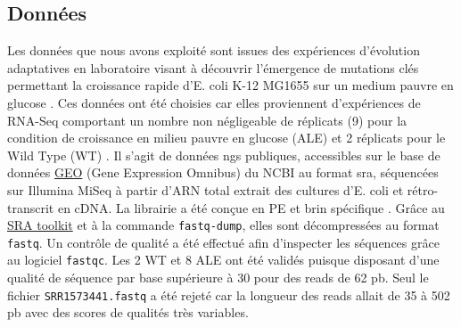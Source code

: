 \documentclass[12pt,a4paper]{report}
\begin{document}
\begin{onehalfspace}
\section*{Données}
Les données que nous avons exploité sont issues des expériences d'évolution adaptatives en laboratoire visant à découvrir l'émergence de mutations clés permettant la croissance rapide d'E. coli K-12 MG1655 sur un medium pauvre en glucose \citep{Lacroix2014}. Ces données ont été choisies car elles proviennent d'expériences de RNA-Seq comportant un nombre non négligeable de réplicats (9) pour la condition de croissance en milieu pauvre en glucose (ALE) et 2 réplicats pour le Wild Type (WT) . Il s'agit de données \gls{ngs} publiques, accessibles sur le base de données \href{http://www.ncbi.nlm.nih.gov/geo/query/acc.cgi?acc=GSE61327}{GEO} (Gene Expression Omnibus) du NCBI au format \gls{sra}, séquencées sur Illumina MiSeq à partir d'ARN total extrait des cultures d'E. coli et rétro-transcrit en cDNA. La librairie a été conçue en \gls{PE} et brin spécifique \citep{Levin2010}. Grâce au \href{http://www.ncbi.nlm.nih.gov/books/NBK158900/#SRA_download.how_do_i_use_the_sra_toolki}{SRA toolkit} et à la commande \texttt{fastq-dump}, elles sont décompressées au format \texttt{fastq}. Un contrôle de qualité a été effectué afin d'inspecter les séquences grâce au logiciel \texttt{fastqc}. Les 2 WT et 8 ALE ont été validés puisque disposant d'une qualité de séquence par base supérieure à 30 pour des \gls{reads} de 62 pb. Seul le fichier \texttt{SRR1573441.fastq} a été rejeté car la longueur des reads allait de 35 à 502 pb avec des scores de qualités très variables.


\end{onehalfspace}
\end{document}
